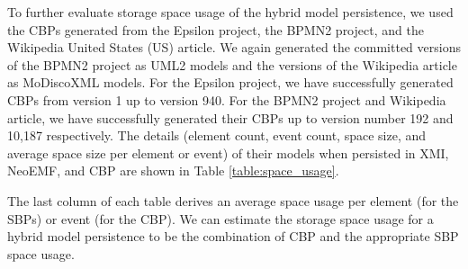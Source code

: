 \documentclass{llncs}
\begin{document}
To further evaluate storage space usage of the hybrid model persistence, we used the CBPs generated from the Epsilon project, the BPMN2 project, and the Wikipedia United States (US) article. We again generated the committed versions of the BPMN2 project as UML2 models and the versions of the Wikipedia article as MoDiscoXML models. For the Epsilon project, we have successfully generated CBPs from version 1 up to version 940. For the BPMN2 project and Wikipedia article, we have successfully generated their CBPs up to version number 192 and 10,187 respectively. The details (element count, event count, space size, and average space size per element or event) of their models when persisted in XMI, NeoEMF, and CBP are shown in Table \ref{table:space_usage}. 

The last column of each table derives an average space usage per element (for the SBPs) or event (for the CBP). We can estimate the storage space usage for a hybrid model persistence to be the combination of CBP and the appropriate SBP space usage.
\end{document}
